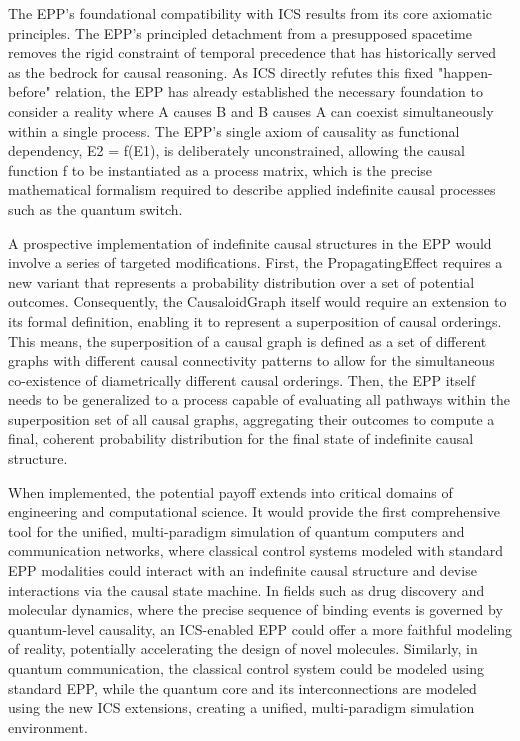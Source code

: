 The EPP’s foundational compatibility with ICS results from its core axiomatic principles. The EPP's principled detachment from a presupposed spacetime removes the rigid constraint of temporal precedence that has historically served as the bedrock for causal reasoning. As ICS directly refutes this fixed "happen-before" relation, the EPP has already established the necessary foundation to consider a reality where A causes B and B causes A can coexist simultaneously within a single process. The EPP’s single axiom of causality as functional dependency, E2 = f(E1), is deliberately unconstrained, allowing the causal function f to be instantiated as a process matrix, which is the precise mathematical formalism required to describe applied indefinite causal processes such as the quantum switch.

A prospective implementation of indefinite causal structures in the EPP would involve a series of targeted modifications. First, the PropagatingEffect requires a new variant that represents a probability distribution over a set of potential outcomes. Consequently, the CausaloidGraph itself would require an extension to its formal definition, enabling it to represent a superposition of causal orderings. This means, the superposition of a causal graph is defined as a set of different graphs with different causal connectivity patterns to allow for the simultaneous co-existence of diametrically different causal orderings. Then, the EPP itself needs to be generalized to a process capable of evaluating all pathways within the superposition set of all causal graphs, aggregating their outcomes to compute a final, coherent probability distribution for the final state of indefinite causal structure.

When implemented, the potential payoff extends into critical domains of engineering and computational science. It would provide the first comprehensive tool for the unified, multi-paradigm simulation of quantum computers and communication networks, where classical control systems modeled with standard EPP modalities could interact with an indefinite causal structure and devise interactions via the causal state machine. In fields such as drug discovery and molecular dynamics, where the precise sequence of binding events is governed by quantum-level causality, an ICS-enabled EPP could offer a more faithful modeling of reality, potentially accelerating the design of novel molecules. Similarly, in quantum communication, the classical control system could be modeled using standard EPP, while the quantum core and its interconnections are modeled using the new ICS extensions, creating a unified, multi-paradigm simulation environment.

